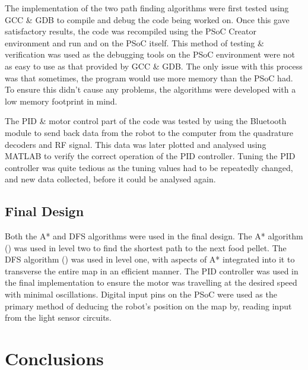 \documentclass{article}
\begin{document}
The implementation of the two path finding algorithms were first tested using GCC \& GDB to compile and debug the code being worked on. Once this gave satisfactory results, the code was recompiled using the PSoC Creator environment and run and on the PSoC itself. This method of testing \& verification was used as the debugging tools on the PSoC environment were not as easy to use as that provided by GCC \& GDB. The only issue with this process was that sometimes, the program would use more memory than the PSoC had. To ensure this didn't cause any problems, the algorithms were developed with a low memory footprint in mind.

The PID \& motor control part of the code was tested by using the Bluetooth module to send back data from the robot to the computer from the quadrature decoders and RF signal. This data was later plotted and analysed using MATLAB to verify the correct operation of the PID controller. Tuning the PID controller was quite tedious as the tuning values had to be repeatedly changed, and new data collected, before it could be analysed again.

\subsection{Final Design}

Both the A* and DFS algorithms were used in the final design. The A* algorithm () was used in level two to find the shortest path to the next food pellet. The DFS algorithm () was used in level one, with aspects of A* integrated into it to transverse the entire map in an efficient manner. The PID controller was used in the final implementation to ensure the motor was travelling at the desired speed with minimal oscillations. Digital input pins on the PSoC were used as the primary method of deducing the robot's position on the map by, reading input from the light sensor circuits.


\section{Conclusions}
\end{document}
